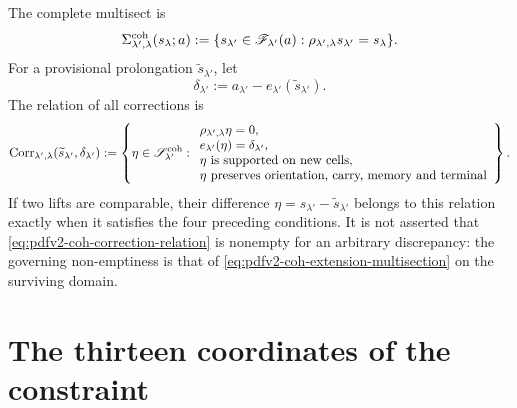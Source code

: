 The complete multisect is
\begin{equation}\label{eq:pdfv2-coh-extension-multisection}
 \Sigma_{\lambda',\lambda}^{\rm coh}(s_\lambda;a)
 :=\{s_{\lambda'}\in\mathscr F_{\lambda'}(a):
 \rho_{\lambda',\lambda}s_{\lambda'}=s_\lambda\}.
\end{equation}
For a provisional prolongation \(\widetilde s_{\lambda'}\), let
\begin{equation}\label{eq:pdfv2-coh-discrepancy}
 \delta_{\lambda'}:=
 a_{\lambda'}-e_{\lambda'}(\widetilde s_{\lambda'}).
\end{equation}
The relation of all corrections is
\begin{equation}\label{eq:pdfv2-coh-correction-relation}
 \operatorname{Corr}_{\lambda',\lambda}
 (\widetilde s_{\lambda'},\delta_{\lambda'})
 :=\left\{\eta\in\mathscr S_{\lambda'}^{\rm coh}:
 \begin{array}{l}
 \rho_{\lambda',\lambda}\eta=0,\\
 e_{\lambda'}(\eta)=\delta_{\lambda'},\\
 \eta\text{ is supported on new cells},\\
 \eta\text{ preserves orientation, carry, memory and terminal}
 \end{array}
 \right\}.
\end{equation}
If two lifts are comparable, their difference
\(\eta=s_{\lambda'}-\widetilde s_{\lambda'}\) belongs to this relation
exactly when it satisfies the four preceding conditions. It is not asserted
that \eqref{eq:pdfv2-coh-correction-relation} is nonempty for an
arbitrary discrepancy: the governing non-emptiness is that of
\eqref{eq:pdfv2-coh-extension-multisection} on the surviving domain.

\iffalse
\section{The thirteen coordinates of the constraint}
\label{sec:pdfv2-coh-thirteen}

